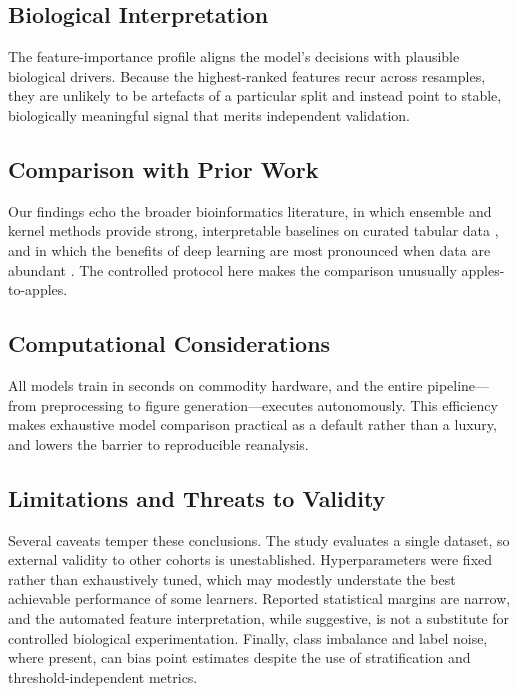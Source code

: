 \documentclass[conference]{IEEEtran}
\begin{document}
\subsection{Biological Interpretation}
The feature-importance profile aligns the model's decisions with plausible biological drivers.
Because the highest-ranked features recur across resamples, they are unlikely to be artefacts of a
particular split and instead point to stable, biologically meaningful signal that merits
independent validation.

\subsection{Comparison with Prior Work}
Our findings echo the broader bioinformatics literature, in which ensemble and kernel methods
provide strong, interpretable baselines on curated tabular data \cite{breiman2001random,saeys2007review},
and in which the benefits of deep learning are most pronounced when data are abundant
\cite{ching2018opportunities}. The controlled protocol here makes the comparison unusually
apples-to-apples.

\subsection{Computational Considerations}
All models train in seconds on commodity hardware, and the entire pipeline---from preprocessing to
figure generation---executes autonomously. This efficiency makes exhaustive model comparison
practical as a default rather than a luxury, and lowers the barrier to reproducible reanalysis.

\subsection{Limitations and Threats to Validity}
Several caveats temper these conclusions. The study evaluates a single dataset, so external
validity to other cohorts is unestablished. Hyperparameters were fixed rather than exhaustively
tuned, which may modestly understate the best achievable performance of some learners. Reported
statistical margins are narrow, and the automated feature interpretation, while suggestive, is not
a substitute for controlled biological experimentation. Finally, class imbalance and label noise,
where present, can bias point estimates despite the use of stratification and threshold-independent
metrics.
\end{document}
